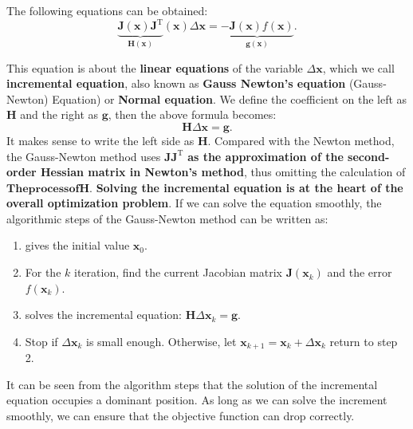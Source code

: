 The following equations can be obtained:
\begin{equation}
\underbrace{\bm{J} {\left( \bm{x} \right)} \bm{J}^\mathrm{T}}_{\bm{H}(\bm{x})} \left ( \bm{x} \right)\Delta \bm{x} = \underbrace{- \bm{J} {\left( \bm{x} \right)} f\left( \bm{x} \right )}_{\bm{g}(\bm{x})}.
\end{equation}

This equation is about the \textbf{linear equations} of the variable $\Delta \bm{x}$, which we call \textbf{incremental equation}, also known as \textbf{Gauss Newton's equation} (Gauss-Newton) Equation) or \textbf{Normal equation}. We define the coefficient on the left as $\bm{H}$ and the right as $\bm{g}$, then the above formula becomes:
\begin{equation}
\label{eq:minimize-deltax}
\bm{H} \Delta \bm{x} = \bm{g}.
\end{equation}
It makes sense to write the left side as $\bm{H}$. Compared with the Newton method, the Gauss-Newton method uses $\bm{J}\bm{J}^\mathrm{T}$ \textbf{ as the approximation of the second-order Hessian matrix in Newton's method}, thus omitting the calculation of $\bm{ The process of H}$. \textbf{Solving the incremental equation is at the heart of the overall optimization problem}. If we can solve the equation smoothly, the algorithmic steps of the Gauss-Newton method can be written as:

\begin{mdframed}
\begin{enumerate}
\item gives the initial value $\bm{x}_0$.
\item For the $k$ iteration, find the current Jacobian matrix $\bm{J}(\bm{x}_k)$ and the error $f(\bm{x}_k)$.
\item solves the incremental equation: $\bm{H} \Delta \bm{x}_k = \bm{g}$.
\item Stop if $\Delta \bm{x}_k$ is small enough. Otherwise, let $\bm{x}_{k+1} = \bm{x}_k+\Delta \bm{x}_k$ return to step 2.
\end{enumerate}
\end{mdframed}

It can be seen from the algorithm steps that the solution of the incremental equation occupies a dominant position. As long as we can solve the increment smoothly, we can ensure that the objective function can drop correctly.

